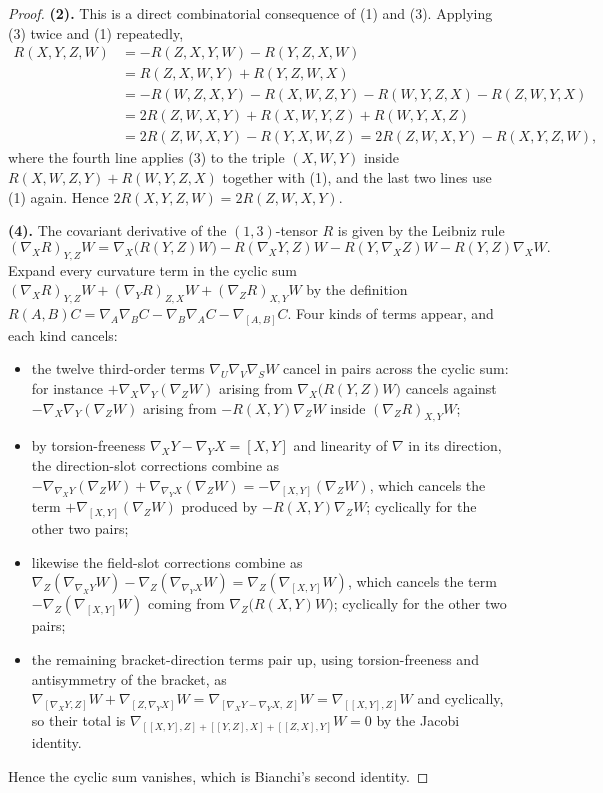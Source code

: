 \begin{proof}
  \textbf{(2).} This is a direct combinatorial consequence of (1) and (3). Applying
  (3) twice and (1) repeatedly,
  \begin{align*}
    R(X,Y,Z,W)&=-R(Z,X,Y,W)-R(Y,Z,X,W)\\
    &=R(Z,X,W,Y)+R(Y,Z,W,X)\\
    &=-R(W,Z,X,Y)-R(X,W,Z,Y)-R(W,Y,Z,X)-R(Z,W,Y,X)\\
    &=2R(Z,W,X,Y)+R(X,W,Y,Z)+R(W,Y,X,Z)\\
    &=2R(Z,W,X,Y)-R(Y,X,W,Z)=2R(Z,W,X,Y)-R(X,Y,Z,W),
  \end{align*}
  where the fourth line applies (3) to the triple $(X,W,Y)$ inside
  $R(X,W,Z,Y)+R(W,Y,Z,X)$ together with (1), and the last two lines use (1)
  again. Hence $2R(X,Y,Z,W)=2R(Z,W,X,Y)$.

  \textbf{(4).} The covariant derivative of the $(1,3)$-tensor $R$ is given by
  the Leibniz rule
  \[
    (\nabla_XR)_{Y,Z}W
    =\nabla_X\big(R(Y,Z)W\big)-R(\nabla_XY,Z)W-R(Y,\nabla_XZ)W-R(Y,Z)\nabla_XW.
  \]
  Expand every curvature term in the cyclic sum
  $(\nabla_XR)_{Y,Z}W+(\nabla_YR)_{Z,X}W+(\nabla_ZR)_{X,Y}W$ by the definition
  $R(A,B)C=\nabla_A\nabla_BC-\nabla_B\nabla_AC-\nabla_{[A,B]}C$. Four kinds of
  terms appear, and each kind cancels:
  \begin{itemize}
    \item[(i)] the twelve third-order terms $\nabla_U\nabla_V\nabla_SW$ cancel
    in pairs across the cyclic sum: for instance
    $+\nabla_X\nabla_Y(\nabla_ZW)$ arising from $\nabla_X\big(R(Y,Z)W\big)$
    cancels against $-\nabla_X\nabla_Y(\nabla_ZW)$ arising from
    $-R(X,Y)\nabla_ZW$ inside $(\nabla_ZR)_{X,Y}W$;
    \item[(ii)] by torsion-freeness $\nabla_XY-\nabla_YX=[X,Y]$ and linearity
    of $\nabla$ in its direction, the direction-slot corrections combine as
    $-\nabla_{\nabla_XY}(\nabla_ZW)+\nabla_{\nabla_YX}(\nabla_ZW)
    =-\nabla_{[X,Y]}(\nabla_ZW)$, which cancels the term
    $+\nabla_{[X,Y]}(\nabla_ZW)$ produced by $-R(X,Y)\nabla_ZW$; cyclically for
    the other two pairs;
    \item[(iii)] likewise the field-slot corrections combine as
    $\nabla_Z(\nabla_{\nabla_XY}W)-\nabla_Z(\nabla_{\nabla_YX}W)
    =\nabla_Z(\nabla_{[X,Y]}W)$, which cancels the term
    $-\nabla_Z(\nabla_{[X,Y]}W)$ coming from $\nabla_Z\big(R(X,Y)W\big)$;
    cyclically for the other two pairs;
    \item[(iv)] the remaining bracket-direction terms pair up, using
    torsion-freeness and antisymmetry of the bracket, as
    $\nabla_{[\nabla_XY,Z]}W+\nabla_{[Z,\nabla_YX]}W
    =\nabla_{[\nabla_XY-\nabla_YX,\,Z]}W=\nabla_{[[X,Y],Z]}W$ and cyclically,
    so their total is
    $\nabla_{[[X,Y],Z]+[[Y,Z],X]+[[Z,X],Y]}W=0$ by the Jacobi identity.
  \end{itemize}
  Hence the cyclic sum vanishes, which is Bianchi's second identity.
\end{proof}

